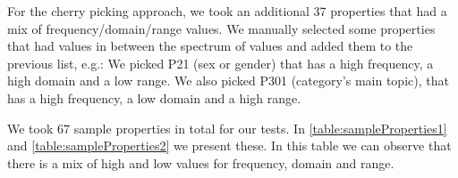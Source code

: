 For the cherry picking approach, we took an additional 37 properties that had a mix of frequency/domain/range values. We manually selected some properties that had values in between the spectrum of values and added them to the previous list, e.g.: We picked P21 (sex or gender) that has a high frequency, a high domain and a low range. We also picked P301 (category's main topic), that has a high frequency, a low domain and a high range.

We took 67 sample properties in total for our tests. In \autoref{table:sampleProperties1} and \autoref{table:sampleProperties2} we present these. In this table we can observe that there is a mix of high and low values for frequency, domain and range.

\begin{table}[]
\end{table}
